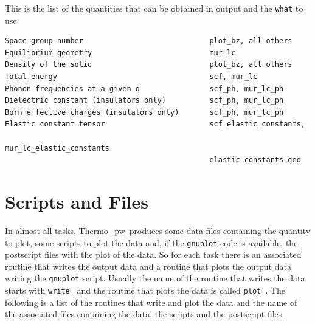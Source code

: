 \documentclass[12pt,a4paper,twoside]{report}
\def\tpw{{\sc Thermo}\_{\sc pw}}
\begin{document}
This is the list of the quantities that can be obtained in output
and the \texttt{what} to use:

\begin{footnotesize}
\begin{verbatim}
Space group number                             plot_bz, all others
Equilibrium geometry                           mur_lc
Density of the solid                           plot_bz, all others
Total energy                                   scf, mur_lc
Phonon frequencies at a given q                scf_ph, mur_lc_ph
Dielectric constant (insulators only)          scf_ph, mur_lc_ph
Born effective charges (insulators only)       scf_ph, mur_lc_ph
Elastic constant tensor                        scf_elastic_constants, 
                                               mur_lc_elastic_constants
                                               elastic_constants_geo
\end{verbatim}
\end{footnotesize}

\newpage
{\color{dark-blue}\chapter{Scripts and Files}}
\color{black}

In almost all tasks, \tpw\ produces some data files containing the quantity 
to plot, some scripts to plot the data and, if the \texttt{gnuplot} code
is available, the postscript files with the plot of the data. So for each 
task there is an associated routine
that writes the output data and a routine that plots the output data
writing the \texttt{gnuplot} script. Usually the name of the routine that
writes the data starts with \texttt{write\_} and the routine that plots
the data is called \texttt{plot\_}. The following is a list of the routines
that write and plot the data and the name of the associated files
containing the data, the scripts and the postscript files.
\end{document}
